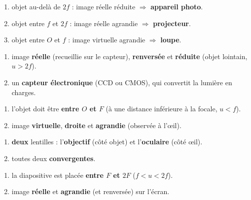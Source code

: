 \documentclass[11pt,a4paper]{article}
\begin{document}

\begin{corrige}
\begin{enumerate}[label=\alph*)]
  \item objet au-delà de $2f$ : image réelle réduite $\Rightarrow$ \textbf{appareil photo}.
  \item objet entre $f$ et $2f$ : image réelle agrandie $\Rightarrow$ \textbf{projecteur}.
  \item objet entre $O$ et $f$ : image virtuelle agrandie $\Rightarrow$ \textbf{loupe}.
\end{enumerate}
\end{corrige}

\begin{corrige}
\begin{enumerate}[label=\alph*)]
  \item image \textbf{réelle} (recueillie sur le capteur), \textbf{renversée} et \textbf{réduite}
        (objet lointain, $u>2f$).
  \item un \textbf{capteur électronique} (CCD ou CMOS), qui convertit la lumière en charges.
\end{enumerate}
\end{corrige}

\begin{corrige}[la loupe]
\begin{enumerate}[label=\alph*)]
  \item l'objet doit être \textbf{entre $O$ et $F$} (à une distance inférieure à la focale, $u<f$).
  \item image \textbf{virtuelle}, \textbf{droite} et \textbf{agrandie} (observée à l'\oe il).
\end{enumerate}
\end{corrige}

\begin{corrige}
\begin{enumerate}[label=\alph*)]
  \item \textbf{deux} lentilles : l'\textbf{objectif} (côté objet) et l'\textbf{oculaire} (côté \oe il).
  \item toutes deux \textbf{convergentes}.
\end{enumerate}
\end{corrige}

\begin{corrige}[le projecteur]
\begin{enumerate}[label=\alph*)]
  \item la diapositive est placée \textbf{entre $F$ et $2F$} ($f<u<2f$).
  \item image \textbf{réelle} et \textbf{agrandie} (et renversée) sur l'écran.
\end{enumerate}
\end{corrige}
\end{document}
